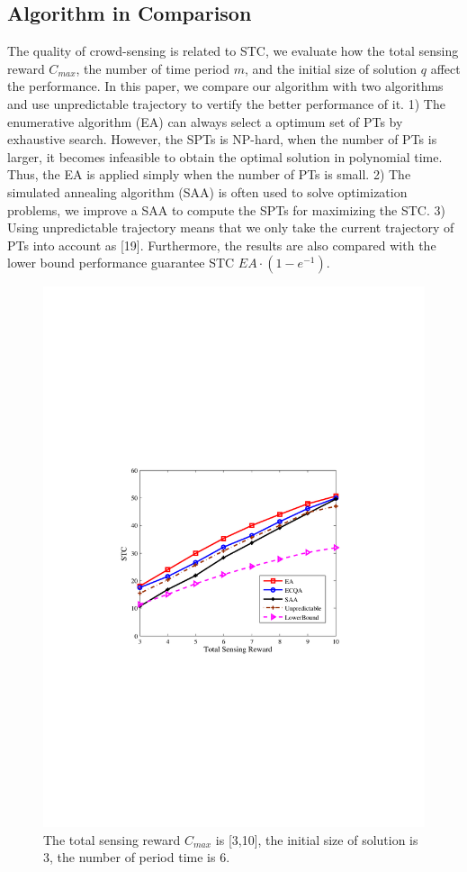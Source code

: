 \documentclass[journal]{IEEEtran}
\begin{document}
\subsection{Algorithm in Comparison}
The quality of crowd-sensing is related to STC, we evaluate how the total sensing reward $C_{max}$, the number of time period $m$, and the initial size of solution $q$ affect the performance. In this paper, we compare our algorithm with two algorithms and use unpredictable trajectory to vertify the better performance of it. 1) The enumerative algorithm (EA) can always select a optimum set of PTs by exhaustive search. However, the SPTs is NP-hard, when the number of PTs is larger, it becomes infeasible to obtain the optimal solution in polynomial time. Thus, the EA is applied simply when the number of PTs is small. 2) The simulated annealing algorithm (SAA) is often used to solve optimization problems, we improve a SAA to compute the SPTs for maximizing the STC. 3) Using unpredictable trajectory means that we only take the current trajectory of PTs into account as [19]. Furthermore, the results are also compared with the lower bound performance guarantee STC $EA\cdot(1-e^{-1})$.

\begin{figure}[h]
	\centering
	\includegraphics[width=0.85\linewidth]{figure4.pdf}
	\caption{The total sensing reward $C_{max}$ is [3,10], the initial size of solution is 3, the number of period time is 6.}
	\label{fig:figure4}
\end{figure}
\end{document}
